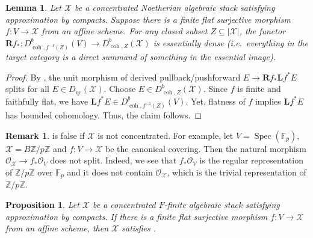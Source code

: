 \documentclass[11pt]{amsart}
\theoremstyle{plain}
\newtheorem{lemma}[theorem]{Lemma}
\newtheorem{proposition}[theorem]{Proposition}
\theoremstyle{definition}
\newtheorem{remark}[theorem]{Remark}
\numberwithin{equation}{section}
\numberwithin{theorem}{section}
\begin{document}
\begin{lemma}
    \label{lem:finite_cover_quotients_for_support}
    Let $\mathcal{X}$ be a concentrated Noetherian algebraic stack satisfying approximation by compacts. 
    Suppose there is a finite flat surjective morphism $f\colon V \to \mathcal{X}$ from an affine scheme. 
    For any closed subset $Z\subseteq |\mathcal{X}|$, the functor $\mathbf{R}f_\ast \colon D^b_{\operatorname{coh},f^{-1}(Z)}(V) \to D^b_{\operatorname{coh},Z}(\mathcal{X})$ is essentially dense (i.e.\ everything in the target category is a direct summand of something in the essential image).
\end{lemma}

\begin{proof}
    By \cite[Lemma 6.2]{DeDeyn/Lank/ManaliRahul/Peng:2025}, the unit morphism of derived pullback/pushforward $E \to \mathbf{R}f_\ast\mathbf{L}f^\ast E$ splits for all $E\in D_{\operatorname{qc}}(\mathcal{X})$. 
    Choose $E\in D^b_{\operatorname{coh},Z}(\mathcal{X})$. 
    Since $f$ is finite and faithfully flat, we have $\mathbf{L}f^\ast E \in D^b_{\operatorname{coh},f^{-1}(Z)}(V)$. 
    Yet, flatness of $f$ implies $\mathbf{L}f^\ast E$ has bounded cohomology. Thus, the claim follows.
\end{proof}

\begin{remark}
    \label{rm:finite_cover_quotients_for_support}
     is false if $\mathcal{X}$ is not concentrated. 
    For example, let $V=\operatorname{Spec}(\mathbb{F}_p)$, $\mathcal{X}=B\mathbb{Z}/p\mathbb{Z}$ and $f\colon V\to\mathcal{X}$ be the canonical covering. 
    Then the natural morphism $\mathcal{O_X}\to f_\ast\mathcal{O}_V$ does not split. 
    Indeed, we see that $f_\ast\mathcal{O}_V$ is the regular representation of $\mathbb{Z}/p\mathbb{Z}$ over $\mathbb{F}_p$ and it does not contain $\mathcal{O}_{\mathcal{X}}$, which is the trivial representation of $\mathbb{Z}/p\mathbb{Z}$.
\end{remark}

\begin{proposition}
    \label{prop:finite_cover}
    Let $\mathcal{X}$ be a concentrated $F$-finite algebraic stack satisfying approximation by compacts.
    If there is a finite flat surjective morphism $f\colon V \to \mathcal{X}$ from an affine scheme, then $\mathcal{X}$ satisfies .
\end{proposition}
\end{document}
